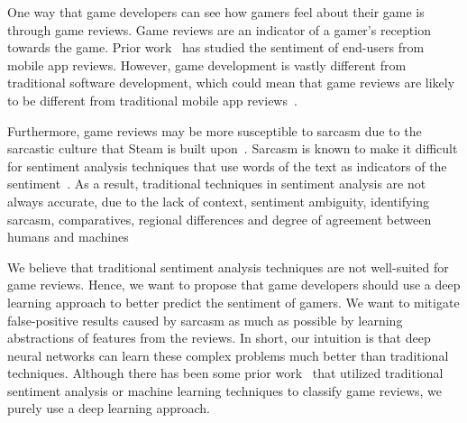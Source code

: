 \documentclass[conference]{IEEEtran}
\begin{document}
One way that game developers can see how gamers feel about their game is through game reviews. Game reviews are an indicator of a gamer's reception towards the game. Prior work~\cite{malavolta2015end} has studied the sentiment of end-users from mobile app reviews. However, game development is vastly different from traditional software development, which could mean that game reviews are likely to be different from traditional mobile app reviews~\cite{pascarella2018video}. 


Furthermore, game reviews may be more susceptible to sarcasm due to the sarcastic culture that Steam is built upon~\cite{baissentiment}. Sarcasm is known to make it difficult for sentiment analysis techniques that use words of the text as indicators of the sentiment~\cite{ganu2009beyond}. As a result, traditional techniques in sentiment analysis are not always accurate, due to the lack of context, sentiment ambiguity, identifying sarcasm, comparatives, regional differences and degree of agreement between humans and machines~\cite{sentimentanalysis}

We believe that traditional sentiment analysis techniques are not well-suited for game reviews. Hence, we want to propose that game developers should use a deep learning approach to better predict the sentiment of gamers. We want to mitigate false-positive results caused by sarcasm as much as possible by learning abstractions of features from the reviews. In short, our intuition is that deep neural networks can learn these complex problems much better than traditional techniques. Although there has been some prior work~\cite{zuo2018sentiment, baissentiment} that utilized traditional sentiment analysis or machine learning techniques to classify game reviews, we purely use a deep learning approach.



\end{document}
